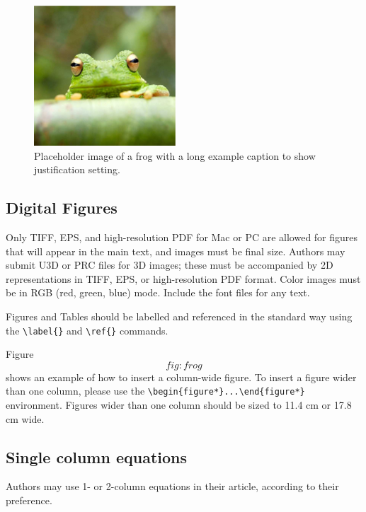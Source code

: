 \documentclass[9pt,twocolumn,twoside,]{pnas-new}
\begin{document}
\begin{figure}
\centering
\includegraphics{frog.png}
\caption{Placeholder image of a frog with a long example caption to show
justification setting.{}}
\end{figure}

\hypertarget{sec:figures}{%
\subsection*{Digital Figures}\label{sec:figures}}

Only TIFF, EPS, and high-resolution PDF for Mac or PC are allowed for
figures that will appear in the main text, and images must be final
size. Authors may submit U3D or PRC files for 3D images; these must be
accompanied by 2D representations in TIFF, EPS, or high-resolution PDF
format. Color images must be in RGB (red, green, blue) mode. Include the
font files for any text.

Figures and Tables should be labelled and referenced in the standard way
using the \texttt{\textbackslash{}label\{\}} and
\texttt{\textbackslash{}ref\{\}} commands.

Figure \[fig:frog\] shows an example of how to insert a column-wide
figure. To insert a figure wider than one column, please use the
\texttt{\textbackslash{}begin\{figure*\}...\textbackslash{}end\{figure*\}}
environment. Figures wider than one column should be sized to 11.4 cm or
17.8 cm wide.

\hypertarget{single-column-equations}{%
\subsection*{Single column equations}\label{single-column-equations}}

Authors may use 1- or 2-column equations in their article, according to
their preference.
\end{document}
